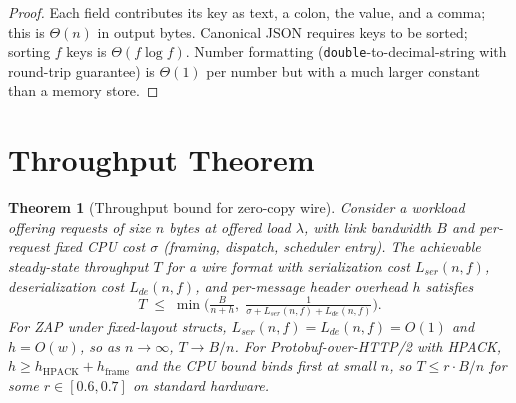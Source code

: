 \documentclass[11pt]{article}
\newtheorem{theorem}{Theorem}
\theoremstyle{definition}
\theoremstyle{remark}
\begin{document}
\begin{proof}
Each field contributes its key as text, a colon, the value, and a
comma; this is $\Theta(n)$ in output bytes. Canonical JSON requires
keys to be sorted; sorting $f$ keys is $\Theta(f \log f)$. Number
formatting (\texttt{double}-to-decimal-string with round-trip
guarantee) is $\Theta(1)$ per number but with a much larger
constant than a memory store.
\end{proof}

\section{Throughput Theorem}
\label{sec:thmthroughput}

\begin{theorem}[Throughput bound for zero-copy wire]
\label{thm:throughput}
Consider a workload offering requests of size $n$ bytes at offered
load $\lambda$, with link bandwidth $B$ and per-request fixed CPU
cost $\sigma$ (framing, dispatch, scheduler entry). The achievable
steady-state throughput $T$ for a wire format with serialization cost
$L_{\textit{ser}}(n,f)$, deserialization cost $L_{\textit{de}}(n,f)$, and per-message
header overhead $h$ satisfies
\begin{equation}
  T \;\leq\; \min\!\Big(
    \tfrac{B}{n+h},\;
    \tfrac{1}{\sigma + L_{\textit{ser}}(n,f) + L_{\textit{de}}(n,f)}
  \Big).
  \label{eq:throughput}
\end{equation}
For ZAP under fixed-layout structs,
$L_{\textit{ser}}(n,f)=L_{\textit{de}}(n,f)=O(1)$ and $h=O(w)$, so as $n \to
\infty$, $T \to B/n$. For Protobuf-over-HTTP/2 with HPACK,
$h \geq h_{\mathrm{HPACK}} + h_{\mathrm{frame}}$ and the CPU bound binds first
at small $n$, so $T \leq r \cdot B/n$ for some $r \in [0.6, 0.7]$
on standard hardware.
\end{theorem}
\end{document}
